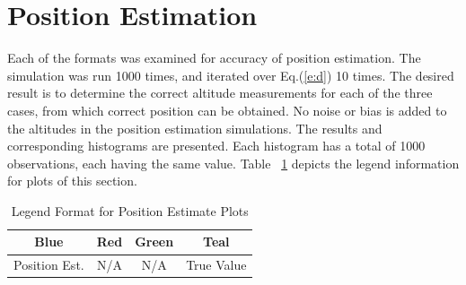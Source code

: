 \documentclass[12pt,a4paper]{book}
\begin{document}
\section{Position Estimation}
Each of the formats was examined for accuracy of position estimation.  The simulation was run 1000 times, and iterated over Eq.(\ref{e:d}) 10 times.  The desired result is to determine the correct altitude measurements for each of the three cases, from which correct position can be obtained. No noise or bias is added to the altitudes in the position estimation simulations. The results and corresponding histograms are presented. Each histogram has a total of 1000 observations, each having the same value. Table ~\ref{t:colorz} depicts the legend information for plots of this section.  
\begin{table}[ht!]
\centering
\begin{tabular}{ |c|c|c|c| } 
 \hline
 Blue & Red & Green & Teal\\ 
 \hline
 Position Est. & N/A & N/A & True Value \\ 
 \hline
\end{tabular}
\caption{Legend Format for Position Estimate Plots}
\label{t:colorz}
\end{table}
\end{document}
